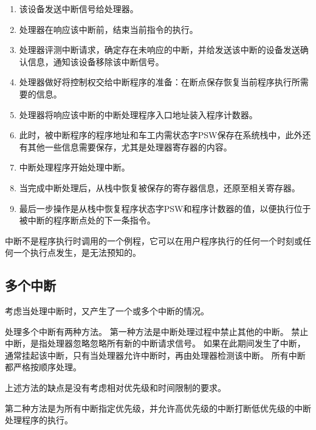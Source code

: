 {{        \begin{enumerate}
            \item 该设备发送中断信号给处理器。
            \item 处理器在响应该中断前，结束当前指令的执行。
            \item 处理器评测中断请求，确定存在未响应的中断，并给发送该中断的设备发送确认信息，通知该设备移除该中断信号。
            \item 处理器做好将控制权交给中断程序的准备：在断点保存恢复当前程序执行所需要的信息。
            \item 处理器将响应该中断的中断处理程序入口地址装入程序计数器。
            \item 此时，被中断程序的程序地址和车工内需状态字PSW保存在系统栈中，此外还有其他一些信息需要保存，尤其是处理器寄存器的内容。
            \item 中断处理程序开始处理中断。
            \item 当完成中断处理后，从栈中恢复被保存的寄存器信息，还原至相关寄存器。
            \item 最后一步操作是从栈中恢复程序状态字PSW和程序计数器的值，以便执行位于被中断的程序断点处的下一条指令。
        \end{enumerate}

        中断不是程序执行时调用的一个例程，它可以在用户程序执行的任何一个时刻或任何一个执行点发生，是无法预知的。
    }

    \subsection{多个中断}
    {
        考虑当处理中断时，又产生了一个或多个中断的情况。

        处理多个中断有两种方法。
        第一种方法是中断处理过程中禁止其他的中断。
        禁止中断，是指处理器忽略忽略所有新的中断请求信号。
        如果在此期间发生了中断，通常挂起该中断，只有当处理器允许中断时，再由处理器检测该中断。
        所有中断都严格按顺序处理。

        上述方法的缺点是没有考虑相对优先级和时间限制的要求。

        第二种方法是为所有中断指定优先级，并允许高优先级的中断打断低优先级的中断处理程序的执行。
    }
}
